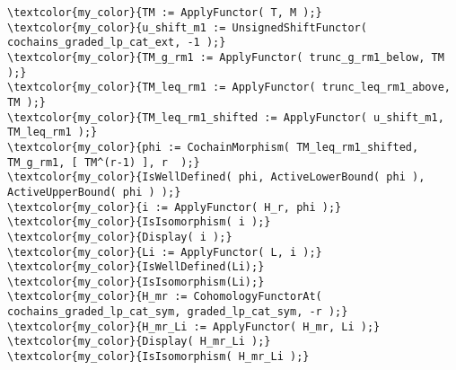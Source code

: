 \documentclass[16pt,a4paper]{extarticle}
\theoremstyle{definition}
\theoremstyle{theorem}
\begin{document}
\begin{Verbatim}[commandchars=\\\{\}, fontseries=b, frame=single, label=Gap Code, framerule=0.5mm, rulecolor=\color{rule_color} ]
\textcolor{my_color}{TM := ApplyFunctor( T, M );}
\textcolor{my_color}{u_shift_m1 := UnsignedShiftFunctor( cochains_graded_lp_cat_ext, -1 );}
\textcolor{my_color}{TM_g_rm1 := ApplyFunctor( trunc_g_rm1_below, TM );}
\textcolor{my_color}{TM_leq_rm1 := ApplyFunctor( trunc_leq_rm1_above, TM );}
\textcolor{my_color}{TM_leq_rm1_shifted := ApplyFunctor( u_shift_m1, TM_leq_rm1 );}
\textcolor{my_color}{phi := CochainMorphism( TM_leq_rm1_shifted, TM_g_rm1, [ TM^(r-1) ], r  );}
\textcolor{my_color}{IsWellDefined( phi, ActiveLowerBound( phi ), ActiveUpperBound( phi ) );}
\textcolor{my_color}{i := ApplyFunctor( H_r, phi );}
\textcolor{my_color}{IsIsomorphism( i );}
\textcolor{my_color}{Display( i );}
\textcolor{my_color}{Li := ApplyFunctor( L, i );}
\textcolor{my_color}{IsWellDefined(Li);}
\textcolor{my_color}{IsIsomorphism(Li);}
\textcolor{my_color}{H_mr := CohomologyFunctorAt( cochains_graded_lp_cat_sym, graded_lp_cat_sym, -r );}
\textcolor{my_color}{H_mr_Li := ApplyFunctor( H_mr, Li );}
\textcolor{my_color}{Display( H_mr_Li );}
\textcolor{my_color}{IsIsomorphism( H_mr_Li );}
\end{Verbatim}
\end{document}
